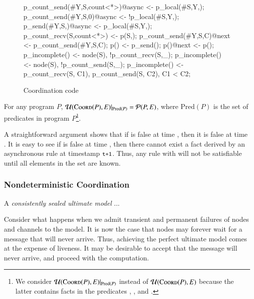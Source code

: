 \begin{figure}[h!]
\label{fig:coordcode}
\begin{Dedalus}
p_count_send(#Y,S,count<*>)@async <- p_local(#S,Y,);
p_count_send(#Y,S,0)@async <- !p_local(#S,Y,\dbar{_});
p_send(#Y,S,)@async <- p_local(#S,Y,);
p_count_recv(S,count<*>) <- p(S,);
p_count_send(#Y,S,C)@next <- p_count_send(#Y,S,C);
p() <- p_send();
p()@next <- p();
p_incomplete() <- node(S), !p_count_recv(S,_);
p_incomplete() <- node(S), !p_count_send(S,_);
p_incomplete() <- p_count_recv(S, C1),
                  p_count_send(S, C2), C1 < C2;
\end{Dedalus}
\caption{Coordination code}
\end{figure}

\begin{theorem}
For any program $P$, $\mathcal{U}(\textsc{Coord}(P), E)|_{\text{Pred}(P)} = \mathcal{P}(P, E)$, where $\text{Pred}(P)$ is the set of predicates in program $P$\footnote{We consider $\mathcal{U}(\textsc{Coord}(P), E)|_{\text{Pred}(P)}$ instead of $\mathcal{U}(\textsc{Coord}(P), E)$ because the latter contains facts in the predicates , , and .}.
\end{theorem}

A straightforward argument shows that if  is false at time , then it is false at time .  It is easy to see if  is false at time , then there cannot exist a  fact derived by an asynchronous rule at timestamp $\dedalus{t+1}$.  Thus, any rule with  will not be satisfiable until all elements in the  set are known.


\subsubsection{Nondeterministic Coordination}

\begin{definition}
A {\em consistently sealed ultimate model} ...
\end{definition}


Consider what happens when we admit transient and permanent failures of nodes and channels to the model.  It is now the case that nodes may forever wait for a message that will never arrive.  Thus, achieving the perfect ultimate model comes at the expense of liveness.  It may be desirable to accept that the message will never arrive, and proceed with the computation.

